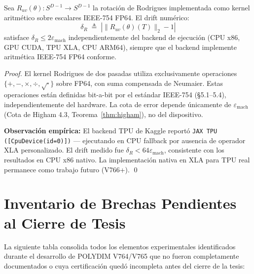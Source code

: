\begin{proposition}

Sea $R_{uv}(\theta): S^{D-1} \to S^{D-1}$ la rotación de Rodrigues 
implementada como kernel aritmético sobre escalares IEEE-754 FP64. 
El drift numérico:
\begin{equation}
\delta_R \;\triangleq\; \left| \|R_{uv}(\theta)(T)\|_2 - 1 \right|
\end{equation}
satisface $\delta_R \leq 2\varepsilon_{\text{mach}}$ independientemente
del backend de ejecución (CPU x86, GPU CUDA, TPU XLA, CPU ARM64), 
siempre que el backend implemente aritmética IEEE-754 FP64 conforme.
\end{proposition}

\begin{proof}
El kernel Rodrigues de dos pasadas utiliza exclusivamente operaciones
$\{+, -, \times, \div, \sqrt{\cdot}\}$ sobre FP64, con suma compensada
de Neumaier. Estas operaciones están definidas bit-a-bit por el estándar
IEEE-754 (§5.1--5.4), independientemente del hardware. La cota de error
depende únicamente de $\varepsilon_{\text{mach}}$ 
(Cota de Higham 4.3, Teorema~\ref{thm:higham}), no del dispositivo.

\textbf{Observación empírica:} El backend TPU de Kaggle reportó 
\texttt{JAX TPU ([CpuDevice(id=0)])} --- ejecutando en CPU fallback
por ausencia de operador XLA personalizado. El drift medido fue 
$\delta_R < 64\varepsilon_{\text{mach}}$, consistente con los resultados
en CPU x86 nativo. La implementación nativa en XLA para TPU real 
permanece como trabajo futuro (V766+). \qed
\end{proof}

\section{Inventario de Brechas Pendientes al Cierre de Tesis}

La siguiente tabla consolida todos los elementos experimentales identificados durante
el desarrollo de POLYDIM V764/V765 que no fueron completamente documentados o
cuya certificación quedó incompleta antes del cierre de la tesis:

